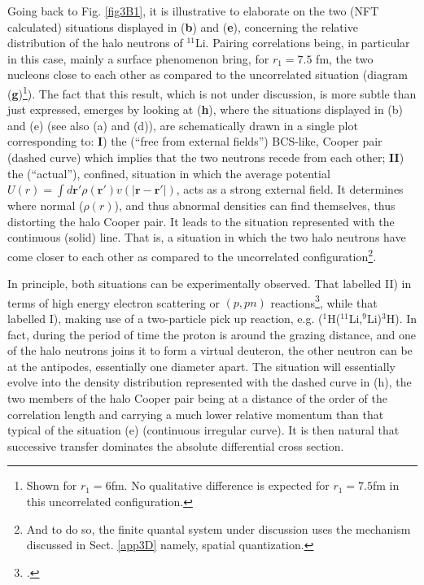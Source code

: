 Going back to Fig. \ref{fig3B1}, it is illustrative to elaborate on the two (NFT calculated) situations displayed in (\textbf{b}) and (\textbf{e}), concerning the relative distribution of the halo neutrons of $^{11}$Li. Pairing correlations being, in particular in this case, mainly a surface phenomenon bring, for $r_1=7.5$ fm, the two nucleons close to each other as compared to the uncorrelated situation (diagram (\textbf{g})\footnote{Shown for $r_1=6$fm. No qualitative difference is expected for $r_1=7.5$fm in this uncorrelated configuration.}). The fact that this result, which is not under discussion, is more subtle than just expressed, emerges by looking at (\textbf{h}), where the situations displayed in (b) and (e) (see also (a) and (d)), are schematically drawn in a single plot corresponding to: \textbf{I}) the (``free from external fields'') BCS-like, Cooper pair  (dashed curve) which implies that the two neutrons recede from each other; \textbf{II}) the (``actual''), confined, situation in which the average potential $U(r)=\int  d\mathbf r' \rho(\mathbf r')v(|\mathbf r-\mathbf r'|)$, acts as a strong external field. It determines where normal ($\rho(r)$), and thus abnormal densities can find themselves, thus distorting the halo Cooper pair. It leads to the situation represented with the continuous (solid) line. That is, a situation in which the two halo neutrons have come closer to each other as compared to the uncorrelated configuration\footnote{And to do so, the finite quantal system under discussion uses the mechanism discussed in Sect. \ref{app3D} namely, spatial quantization.}. 


In principle, both situations can be experimentally observed. That labelled II) in terms of high energy electron scattering or $(p,pn)$ reactions\footnote{\cite{Kubota:20}.}, while that labelled I),  making use of a two-particle pick up reaction, e.g. ($^1$H($^{11}$Li,$^9$Li)$^3$H). In fact, during the period of time the proton is around the grazing distance, and one of the halo neutrons joins it to form a virtual deuteron, the other neutron can be at the antipodes, essentially one diameter apart. The situation will essentially evolve into the density distribution represented with the dashed curve in (h), the two members of the halo Cooper pair being at a distance of the order of the correlation length  and carrying a much lower relative momentum than that typical of the situation (e) (continuous irregular curve). It is then natural that successive transfer dominates the absolute differential cross section.

